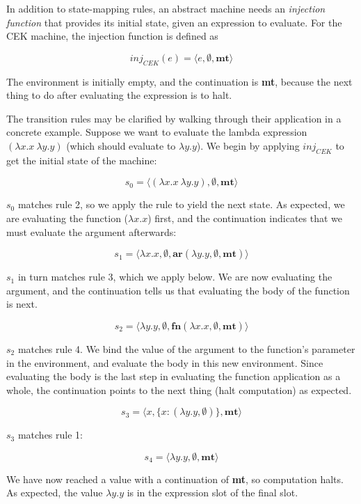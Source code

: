 \documentclass{article}
\begin{document}
In addition to state-mapping rules, an abstract machine needs an \textit{injection function} that provides its initial state, given an expression to evaluate. For the CEK machine, the injection function is defined as

$$ inj_{CEK}(e) = \langle e, \emptyset, \textbf{mt} \rangle $$

The environment is initially empty, and the continuation is \textbf{mt}, because the next thing to do after evaluating the expression is to halt.

The transition rules may be clarified by walking through their application in a concrete example. Suppose we want to evaluate the lambda expression $(\lambda x.x\ \lambda y.y)$ (which should evaluate to $\lambda y.y$). We begin by applying $inj_{CEK}$ to get the initial state of the machine:

$$ s_0 = \langle (\lambda x.x\ \lambda y.y), \emptyset, \textbf{mt} \rangle $$

$s_0$ matches rule 2, so we apply the rule to yield the next state. As expected, we are evaluating the function ($\lambda x.x$) first, and the continuation indicates that we must evaluate the argument afterwards:

$$ s_1 = \langle \lambda x.x, \emptyset, \textbf{ar}(\lambda y.y, \emptyset, \textbf{mt}) \rangle $$

$s_1$ in turn matches rule 3, which we apply below. We are now evaluating the argument, and the continuation tells us that evaluating the body of the function is next.

$$ s_2 = \langle \lambda y.y, \emptyset, \textbf{fn}(\lambda x.x, \emptyset, \textbf{mt}) \rangle $$

$s_2$ matches rule 4. We bind the value of the argument to the function's parameter in the environment, and evaluate the body in this new environment. Since evaluating the body is the last step in evaluating the function application as a whole, the continuation points to the next thing (halt computation) as expected.

$$ s_3 = \langle x, \{ x: (\lambda y.y, \emptyset) \}, \textbf{mt} \rangle $$

$s_3$ matches rule 1:

$$ s_4 = \langle \lambda y.y, \emptyset, \textbf{mt} \rangle $$

We have now reached a value with a continuation of \textbf{mt}, so computation halts. As expected, the value $\lambda y.y$ is in the expression slot of the final slot.
\end{document}
